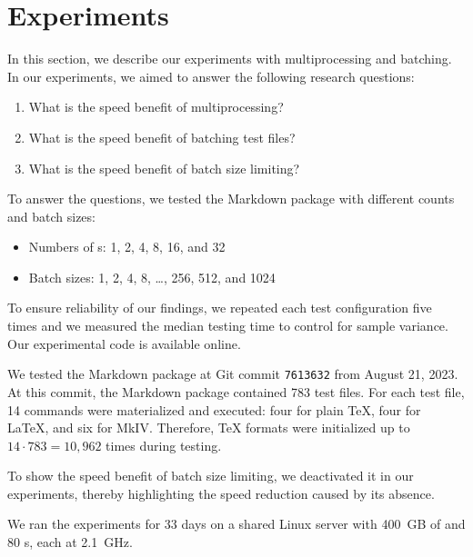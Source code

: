 \documentclass[final]{ltugboat}
\begin{document}
\section{Experiments}
\label{sec:experiments}

In this section, we describe our experiments with multiprocessing and batching. In our experiments, we aimed to answer the following research questions:
\begin{enumerate}
\item What is the speed benefit of multiprocessing?
\item What is the speed benefit of batching test files?
\item What is the speed benefit of batch size limiting?
\end{enumerate}
To answer the questions, we tested the Markdown package with different  counts and batch sizes:
\begin{itemize}
\item Numbers of s: 1, 2, 4, 8, 16, and 32
\item Batch sizes: 1, 2, 4, 8, \ldots, 256, 512, and 1024
\end{itemize}
To ensure reliability of our findings, we repeated each test configuration five times and we measured the median testing time to control for sample variance. Our experimental code is available online.~\cite{starynovotny2023measure}

We tested the Markdown package at Git commit \texttt{7613632} from August 21, 2023. At this commit, the Markdown package contained 783 test files. For each test file, 14 commands were materialized and executed: four for plain \TeX, four for \LaTeX, and six for  MkIV. Therefore, \TeX{} formats were initialized up to $14\cdot 783 = 10{,}962$ times during testing.

To show the speed benefit of batch size limiting, we deactivated it in our experiments, thereby highlighting the speed reduction caused by its absence.

We ran the experiments for 33 days on a shared Linux server with 400~GB of  and 80 s, each at 2.1~GHz.
\end{document}
